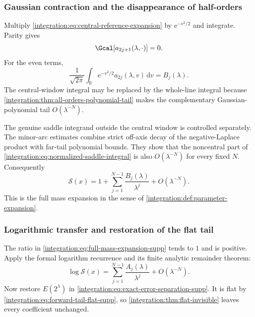 \documentclass[11pt,oneside]{article}
\theoremstyle{definition}
\theoremstyle{remark}
\newcommand{\R}{\mathbb R}
\newcommand{\e}{\mathrm e}
\newcommand{\dd}{\,\mathrm d}
\begin{document}
\subsubsection{Gaussian contraction and the disappearance of half-orders}

Multiply \eqref{integration:eq:central-reference-expansion} by $\e^{-v^2/2}$ and integrate.  Parity gives
\begin{equation}
 \Gcal[a_{2j+1}(\lambda,\cdot)]=0.
 \label{integration:eq:odd-saddle-contractions-zero}
\end{equation}
For the even terms,
\begin{equation}
 \frac1{\sqrt{2\pi}}
 \int_\R\e^{-v^2/2}a_{2j}(\lambda,v)\dd v=B_j(\lambda).
 \label{integration:eq:even-saddle-contraction}
\end{equation}
The central-window integral may be replaced by the whole-line integral because
\cref{integration:thm:all-orders-polynomial-tail} makes the complementary Gaussian-polynomial tail
$O(\lambda^{-N})$.

The genuine saddle integrand outside the central window is controlled separately.  The
minor-arc estimates combine strict off-axis decay of the negative-Laplace product with
far-tail polynomial bounds.  They show that the noncentral part of
\eqref{integration:eq:normalized-saddle-integral} is also $O(\lambda^{-N})$ for every fixed $N$.
Consequently
\begin{equation}
 \mathcal S(x)=
 1+\sum_{j=1}^{N-1}\frac{B_j(\lambda)}{\lambda^j}
 +O(\lambda^{-N}).
 \label{integration:eq:full-mass-expansion-supp}
\end{equation}
This is the full mass expansion in the sense of \cref{integration:def:parameter-expansion}.

\subsubsection{Logarithmic transfer and restoration of the flat tail}

The ratio in \eqref{integration:eq:full-mass-expansion-supp} tends to $1$ and is positive.  Apply the
formal logarithm recurrence and its finite analytic remainder theorem:
\begin{equation}
 \log\mathcal S(x)=
 \sum_{j=1}^{N-1}\frac{A_j(\lambda)}{\lambda^j}
 +O(\lambda^{-N}).
 \label{integration:eq:full-log-mass-expansion-supp}
\end{equation}
Now restore $E(2^\lambda)$ in \eqref{integration:eq:exact-error-separation-supp}.  It is flat by
\eqref{integration:eq:forward-tail-flat-supp}, so \cref{integration:thm:flat-invisible} leaves every coefficient
unchanged.
\end{document}
